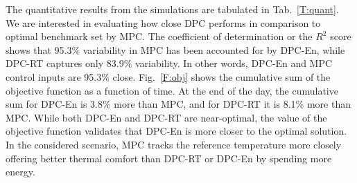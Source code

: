 The quantitative results from the simulations are tabulated in Tab.~\ref{T:quant}. We are interested in evaluating how close DPC performs in comparison to optimal benchmark set by MPC. The coefficient of determination or the $R^2$ score shows that 95.3\% variability in MPC has been accounted for by DPC-En, while DPC-RT captures only 83.9\% variability. In other words, DPC-En and MPC control inputs are 95.3\% close. Fig.~\ref{F:obj} shows the cumulative sum of the objective function as a function of time. At the end of the day, the cumulative sum for DPC-En is 3.8\% more than MPC, and for DPC-RT it is 8.1\% more than MPC. While both DPC-En and DPC-RT are near-optimal, the value of the objective function validates that DPC-En is more closer to the optimal solution.
In the considered scenario, MPC tracks the reference temperature more closely offering better thermal comfort than DPC-RT or DPC-En by spending more energy.